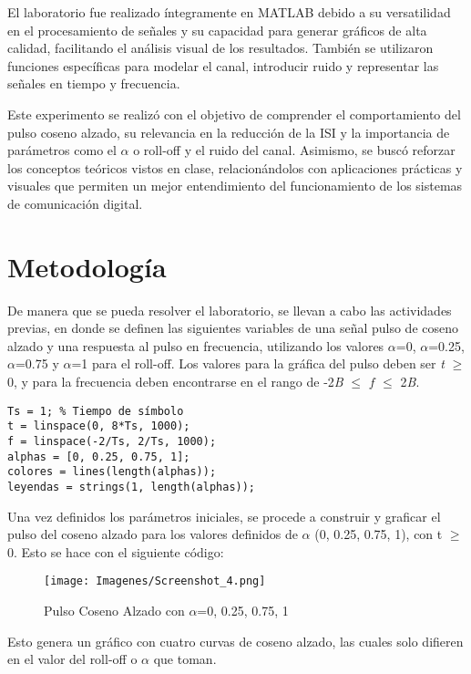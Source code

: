 \documentclass[lettersize,journal]{IEEEtran}
\begin{document}
El laboratorio fue realizado íntegramente en MATLAB debido a su versatilidad en el procesamiento de señales y su capacidad para generar gráficos de alta calidad, facilitando el análisis visual de los resultados. También se utilizaron funciones específicas para modelar el canal, introducir ruido y representar las señales en tiempo y frecuencia.

Este experimento se realizó con el objetivo de comprender el comportamiento del pulso coseno alzado, su relevancia en la reducción de la ISI y la importancia de parámetros como el $\alpha$ o roll-off y el ruido del canal. Asimismo, se buscó reforzar los conceptos teóricos vistos en clase, relacionándolos con aplicaciones prácticas y visuales que permiten un mejor entendimiento del funcionamiento de los sistemas de comunicación digital.


\section{Metodología}\label{sec:metodologia}
De manera que se pueda resolver el laboratorio, se llevan a cabo las actividades previas, en donde se definen las siguientes variables de una señal pulso de coseno alzado y una respuesta al pulso en frecuencia, utilizando los valores $\alpha$=0, $\alpha$=0.25, $\alpha$=0.75 y  $\alpha$=1 para el roll-off. Los valores para la gráfica del pulso deben ser \textit{t} $\geq$ 0, y para la frecuencia deben encontrarse en el rango de -2\textit{B} $\leq$ $f$ $\leq$ 2\textit{B}.
\begin{verbatim}
Ts = 1; % Tiempo de símbolo
t = linspace(0, 8*Ts, 1000);
f = linspace(-2/Ts, 2/Ts, 1000);
alphas = [0, 0.25, 0.75, 1];
colores = lines(length(alphas)); 
leyendas = strings(1, length(alphas)); 
\end{verbatim}
Una vez definidos los parámetros iniciales, se procede a construir y graficar el pulso del coseno alzado para los valores definidos de $\alpha$ (0, 0.25, 0.75, 1), con t $\geq$ 0. 
Esto se hace con el siguiente código:

\begin{figure}[H]
        \centering
        \texttt{[image: Imagenes/Screenshot\_4.png]}
        \label{fig:a1}
        \caption{Pulso Coseno Alzado con $\alpha$=0, 0.25, 0.75, 1}
\end{figure}

Esto genera un gráfico con cuatro curvas de coseno alzado, las cuales solo difieren en el valor del roll-off o $\alpha$ que toman.
\end{document}
